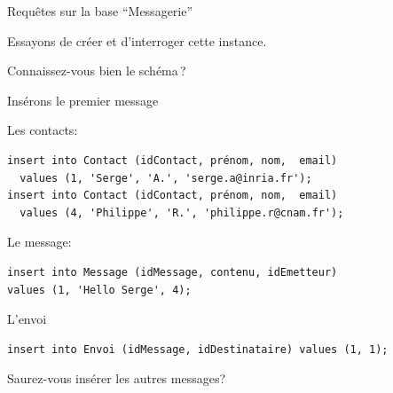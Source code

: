 

\begin{frame}{Requêtes sur la base ``Messagerie''}

Essayons de créer et d'interroger cette instance.

\vfill


\vfill


Connaissez-vous bien le schéma\,?

\end{frame}


\begin{frame}[fragile]{Insérons le premier message}

Les contacts:

\begin{verbatim}
insert into Contact (idContact, prénom, nom,  email)
  values (1, 'Serge', 'A.', 'serge.a@inria.fr');
insert into Contact (idContact, prénom, nom,  email)
  values (4, 'Philippe', 'R.', 'philippe.r@cnam.fr');
\end{verbatim}

\vfill

Le message:

\begin{verbatim}
insert into Message (idMessage, contenu, idEmetteur)
values (1, 'Hello Serge', 4);
\end{verbatim}

\vfill

L'envoi

\begin{verbatim}
insert into Envoi (idMessage, idDestinataire) values (1, 1);
\end{verbatim}

\vfill
\begin{blocgauche}
Saurez-vous insérer les autres messages?
\end{blocgauche}
\end{frame}

